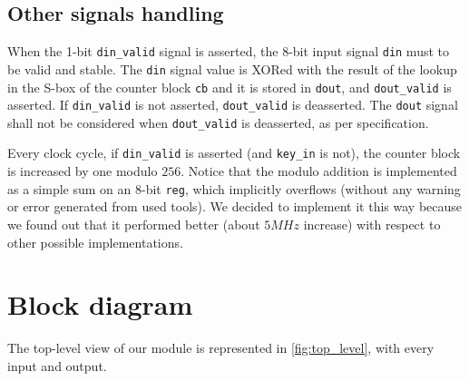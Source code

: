 \subsection{Other signals handling}
When the 1-bit \lstinline{din_valid} signal is asserted, the 8-bit input signal \lstinline{din} must to be valid and stable. The \lstinline{din} signal value is XORed with the result of the lookup in the S-box of the counter block \lstinline{cb} and it is stored in \lstinline{dout}, and \lstinline{dout_valid} is asserted. If \lstinline{din_valid} is not asserted, \lstinline{dout_valid} is deasserted. The \lstinline{dout} signal shall not be considered when \lstinline{dout_valid} is deasserted, as per specification.

Every clock cycle, if \lstinline{din_valid} is asserted (and \lstinline{key_in} is not), the counter block is increased by one modulo $256$. Notice that the modulo addition is implemented as a simple sum on an 8-bit \lstinline{reg}, which implicitly overflows (without any warning or error generated from used tools). We decided to implement it this way because we found out that it performed better (about $5 MHz$ increase) with respect to other possible implementations.

\clearpage
\section{Block diagram}
The top-level view of our module is represented in \cref{fig:top_level}, with every input and output.

